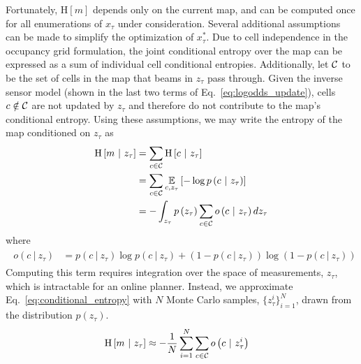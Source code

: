 Fortunately, $\text{H}\left[m\right]$ depends only on the current map, and can be computed once for all enumerations of $x_{\tau}$ under consideration. Several additional assumptions can be made to simplify the optimization of $x_{\tau}^{*}$. Due to cell independence in the occupancy grid formulation, the joint conditional entropy over the map can be expressed as a sum of individual cell conditional entropies. Additionally, let $\mathcal{C}$ to be the set of cells in the map that beams in $z_{\tau}$ pass through. Given the inverse sensor model (shown in the last two terms of Eq.~\eqref{eq:logodds_update}), cells $c \notin \mathcal{C}$ are not updated by $z_{\tau}$ and therefore do not contribute to the map's conditional entropy. Using these assumptions, we may write the entropy of the map conditioned on $z_{\tau}$ as
%
\begin{align}
  \begin{split}
    \text{H}
    \left[
      m
      \ \vert \
      z_{\tau}
    \right]
    &=
    \sum_{c \in \mc{C}}
    \text{H}
    \left[
      c
      \ \vert \
      z_{\tau}
    \right]
    \\
    &=
    \sum_{c \in \mc{C}}
    \expect_{c, z_{\tau}}
    \left[
      -\log
      p
      \left(
      c
      \ \vert \
      z_{\tau}
      \right)
    \right]
    \\
    &=
    -
    \int_{z_{\tau}}
    p
    \left(
    z_{\tau}
    \right)
    \sum_{c \in \mc{C}}
    o
    \left(
    c
    \ \vert \
    z_{\tau}
    \right)
    d z_{\tau}
    \label{eq:conditional_entropy}
  \end{split}
\end{align}
%
where
\begin{align}
  \begin{split}
    o(c \ \vert \ z_{\tau})
    &=
    p(c \ \vert \ z_{\tau})
    \log
    p(c \ \vert \ z_{\tau})
    +
    \left(
    1
    -
    p(c \ \vert \ z_{\tau})
    \right)
    \log
    \left(
    1
    -
    p(c \ \vert \ z_{\tau})
    \right)
  \end{split}
\end{align}
%
Computing this term requires integration over the space of measurements, $z_{\tau}$, which is intractable for an online planner. Instead, we approximate Eq.~\eqref{eq:conditional_entropy} with $N$ Monte Carlo samples, $\{z_{\tau}^{i}\}_{i=1}^{N}$, drawn from the distribution $p(z_{\tau})$.
%
\begin{align}
  \begin{split}
    \text{H}
    \left[
      m
      \ \vert \
      z_{\tau}
    \right]
    &\approx
    -\frac{1}{N}
    \sum_{i=1}^{N}
    \sum_{c \in \mathcal{C}}
    o
    \left(
    c
    \ \vert \
    z_{\tau}^{i}
    \right)
    \label{eq:monte_carlo}
  \end{split}
\end{align}
